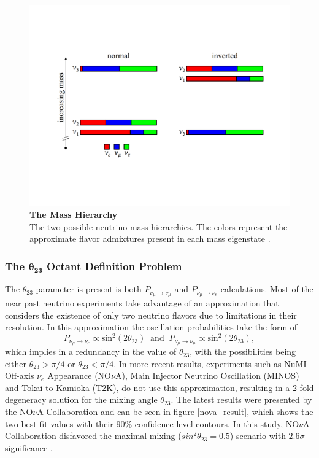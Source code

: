\begin{figure}
	\begin{center}
		\includegraphics[scale=0.5]{Figures/mass_hierarchy.pdf}
		\caption[The Mass Hierarchy]{ {\textbf{The Mass Hierarchy}}\\The two possible neutrino mass hierarchies. The colors represent the approximate flavor admixtures present in each mass eigenstate \cite{prospects_patterson}.}
		\label{mass_hierarchy}	
	\end{center}
\end{figure}

\subsubsection{The $\mathbf{\theta_{23}}$ Octant Definition Problem}

The $\theta_{23}$ parameter is present is both $P_{\nu_\mu \rightarrow \nu_\mu}$ and $P_{\nu_\mu \rightarrow \nu_e}$ calculations. Most of the near past neutrino experiments take advantage of an approximation that considers the existence of only two neutrino flavors due to limitations in their resolution. In this approximation the oscillation probabilities take the form of
%
\begin{equation}
	P_{\nu_\mu \rightarrow \nu_e} \propto \text{sin}^2(2\theta_{23}) \ \text{ and } \ P_{\nu_\mu \rightarrow \nu_\mu} \propto \text{sin}^2(2\theta_{23}),
	\nonumber
\end{equation}
%
which implies in a redundancy in the value of $\theta_{23}$, with the possibilities being either $\theta_{23} > \pi/4$ or $\theta_{23} < \pi/4$. 
In more recent results, experiments such as NuMI Off-axis $\nu_e$ Appearance (NO$\nu$A), Main Injector Neutrino Oscillation (MINOS) and Tokai to Kamioka (T2K), do not use this approximation, resulting in a 2 fold degeneracy solution for the mixing angle $\theta_{23}$. The latest results were presented by the NO$\nu$A Collaboration and can be seen in figure \ref{nova_result}, which shows the two best fit values with their 90\% confidence level contours. In this study, NO$\nu$A Collaboration disfavored the maximal mixing ($sin^2 \theta_{23} = 0.5$) scenario with $2.6 \sigma$ significance \cite{NOVA}.

